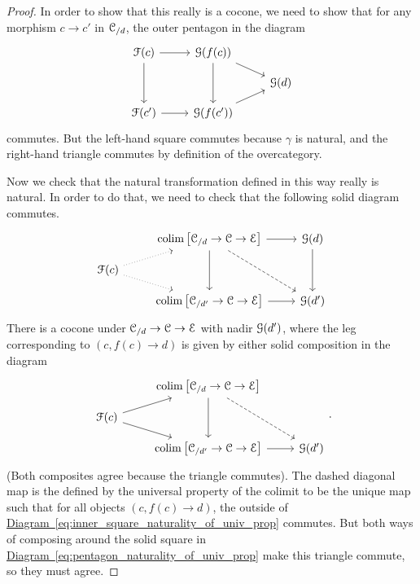\documentclass[main.tex]{subfiles}
\begin{document}
\begin{proof}
  In order to show that this really is a cocone, we need to show that for any morphism $c \to c'$ in $\mathcal{C}_{/d}$, the outer pentagon in the diagram
  \begin{equation*}
    \begin{tikzcd}[row sep=small]
      \mathcal{F}(c)
      \arrow[r]
      \arrow[dd]
      & \mathcal{G}(f(c))
      \arrow[dr]
      \arrow[dd]
      \\
      && \mathcal{G}(d)
      \\
      \mathcal{F}(c')
      \arrow[r]
      & \mathcal{G}(f(c'))
      \arrow[ur]
    \end{tikzcd}
  \end{equation*}
  commutes. But the left-hand square commutes because $\gamma$ is natural, and the right-hand triangle commutes by definition of the overcategory.

  Now we check that the natural transformation defined in this way really is natural. In order to do that, we need to check that the following solid diagram commutes.
  \begin{equation}
    \label{eq:pentagon_naturality_of_univ_prop}
    \begin{tikzcd}[row sep=small]
      & \colim\left[ \category{C}_{/d} \to \category{C} \to \category{E} \right]
      \arrow[r]
      \arrow[dd]
      \arrow[ddr, dashed]
      & \category{G}(d)
      \arrow[dd]
      \\
      \mathcal{F}(c)
      \arrow[ur, dotted]
      \arrow[dr, dotted]
      \\
      & \colim\left[ \category{C}_{/d'} \to \category{C} \to \category{E} \right]
      \arrow[r]
      & \category{G}(d')
    \end{tikzcd}
  \end{equation}
  There is a cocone under $\mathcal{C}_{/d} \to \mathcal{C} \to \mathcal{E}$ with nadir $\mathcal{G}(d')$, where the leg corresponding to $(c, f(c) \to d)$ is given by either solid composition in the diagram
  \begin{equation}
    \label{eq:inner_square_naturality_of_univ_prop}
    \begin{tikzcd}[row sep=small]
      & \colim\left[ \category{C}_{/d} \to \category{C} \to \category{E} \right]
      \arrow[dd]
      \arrow[ddr, dashed]
      \\
      \mathcal{F}(c)
      \arrow[ur]
      \arrow[dr]
      \\
      & \colim\left[ \category{C}_{/d'} \to \category{C} \to \category{E} \right]
      \arrow[r]
      & \category{G}(d')
    \end{tikzcd}.
  \end{equation}
  (Both composites agree because the triangle commutes). The dashed diagonal map is the defined by the universal property of the colimit to be the unique map such that for all objects $(c, f(c) \to d)$, the outside of \hyperref[eq:inner_square_naturality_of_univ_prop]{Diagram~\ref*{eq:inner_square_naturality_of_univ_prop}} commutes. But both ways of composing around the solid square in \hyperref[eq:pentagon_naturality_of_univ_prop]{Diagram~\ref*{eq:pentagon_naturality_of_univ_prop}} make this triangle commute, so they must agree.
\end{proof}
\end{document}
